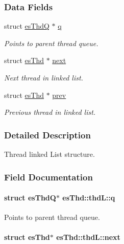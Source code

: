 \subsubsection*{Data Fields}
\begin{DoxyCompactItemize}
\item 
struct \hyperlink{structesThdQ}{es\-Thd\-Q} $\ast$ \hyperlink{structesThd_1_1thdL_a71e1008f14a03a1501c2c8d0be094bba}{q}
\begin{DoxyCompactList}\small\item\em Points to parent thread queue. \end{DoxyCompactList}\item 
struct \hyperlink{structesThd}{es\-Thd} $\ast$ \hyperlink{structesThd_1_1thdL_a2bab6c2a2a5c616e2a7401803236aa49}{next}
\begin{DoxyCompactList}\small\item\em Next thread in linked list. \end{DoxyCompactList}\item 
struct \hyperlink{structesThd}{es\-Thd} $\ast$ \hyperlink{structesThd_1_1thdL_ae7fe28e0efdcae499fa53431065b1a43}{prev}
\begin{DoxyCompactList}\small\item\em Previous thread in linked list. \end{DoxyCompactList}\end{DoxyCompactItemize}


\subsubsection{Detailed Description}
Thread linked List structure. 

\subsubsection{Field Documentation}
\hypertarget{structesThd_1_1thdL_a71e1008f14a03a1501c2c8d0be094bba}{
\paragraph[{q}]{\setlength{\rightskip}{0pt plus 5cm}struct {\bf es\-Thd\-Q}$\ast$ es\-Thd\-::thd\-L\-::q}}\label{structesThd_1_1thdL_a71e1008f14a03a1501c2c8d0be094bba}


Points to parent thread queue. 

\hypertarget{structesThd_1_1thdL_a2bab6c2a2a5c616e2a7401803236aa49}{
\paragraph[{next}]{\setlength{\rightskip}{0pt plus 5cm}struct {\bf es\-Thd}$\ast$ es\-Thd\-::thd\-L\-::next}}\label{structesThd_1_1thdL_a2bab6c2a2a5c616e2a7401803236aa49}


